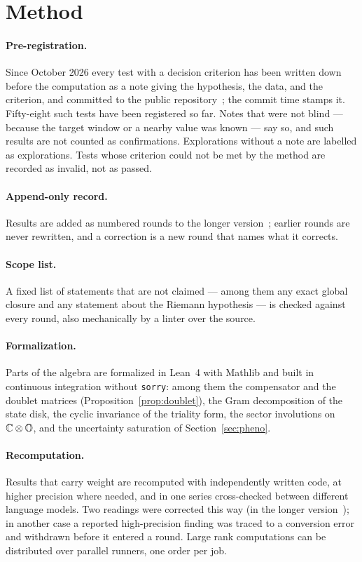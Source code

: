 \section{Method}\label{app:method}

\paragraph{Pre-registration.}  Since October 2026 every test with a decision criterion has been written down before the computation
as a note giving the hypothesis, the data, and the criterion, and committed to the public repository~\cite{repo}; the commit time stamps
it.  Fifty-eight such tests have been registered so far.  Notes that were not blind --- because the target window or a nearby value
was known --- say so, and such results are not counted as confirmations.  Explorations without a note are labelled as explorations.
Tests whose criterion could not be met by the method are recorded as invalid, not as passed.

\paragraph{Append-only record.}  Results are added as numbered rounds to the longer version~\cite{companion}; earlier rounds are never
rewritten, and a correction is a new round that names what it corrects.

\paragraph{Scope list.}  A fixed list of statements that are not claimed --- among them any exact global closure and any statement about the
Riemann hypothesis --- is checked against every round, also mechanically by a linter over the source.

\paragraph{Formalization.}  Parts of the algebra are formalized in Lean~4 with Mathlib and built in continuous integration without
\texttt{sorry}: among them the compensator and the doublet matrices (Proposition~\ref{prop:doublet}), the Gram decomposition of the state
disk, the cyclic invariance of the triality form, the sector involutions on \(\mathbb C\otimes\mathbb O\), and the uncertainty saturation of
Section~\ref{sec:pheno}.

\paragraph{Recomputation.}  Results that carry weight are recomputed with independently written code, at higher precision where
needed, and in one series cross-checked between different language models.  Two readings were corrected this
way (in the longer version~\cite{companion}); in another case a reported high-precision finding was traced to a conversion error and withdrawn before it
entered a round.  Large rank computations can be distributed over parallel runners, one order per job.

